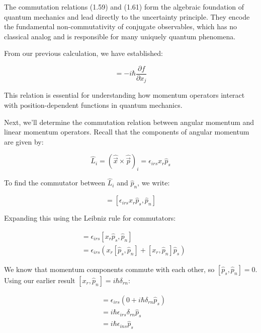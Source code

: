 \documentclass[10pt]{article}
\begin{document}
The commutation relations (1.59) and (1.61) form the algebraic foundation of quantum mechanics and lead directly to the uncertainty principle. They encode the fundamental non-commutativity of conjugate observables, which has no classical analog and is responsible for many uniquely quantum phenomena.


From our previous calculation, we have established:

\begin{equation*}
[\hat{p}_j, f] = -i\hbar\frac{\partial f}{\partial x_j} \tag{1.62}
\end{equation*}

This relation is essential for understanding how momentum operators interact with position-dependent functions in quantum mechanics.

Next, we'll determine the commutation relation between angular momentum and linear momentum operators. Recall that the components of angular momentum are given by:

\begin{equation*}
\hat{L}_i = (\hat{\vec{x}} \times \hat{\vec{p}})_i = \epsilon_{irs}x_r\hat{p}_s \tag{1.63}
\end{equation*}

To find the commutator between $\hat{L}_i$ and $\hat{p}_n$, we write:

\begin{equation*}
[\hat{L}_i, \hat{p}_n] = [\epsilon_{irs}x_r\hat{p}_s, \hat{p}_n] \tag{1.64}
\end{equation*}

Expanding this using the Leibniz rule for commutators:

\begin{align*}
[\hat{L}_i, \hat{p}_n] &= \epsilon_{irs}[x_r\hat{p}_s, \hat{p}_n] \\
&= \epsilon_{irs}(x_r[\hat{p}_s, \hat{p}_n] + [x_r, \hat{p}_n]\hat{p}_s) \tag{1.65}
\end{align*}

We know that momentum components commute with each other, so $[\hat{p}_s, \hat{p}_n] = 0$. Using our earlier result $[x_r, \hat{p}_n] = i\hbar\delta_{rn}$:

\begin{align*}
[\hat{L}_i, \hat{p}_n] &= \epsilon_{irs}(0 + i\hbar\delta_{rn}\hat{p}_s) \\
&= i\hbar\epsilon_{irs}\delta_{rn}\hat{p}_s \\
&= i\hbar\epsilon_{ins}\hat{p}_s
\end{align*}
\end{document}
